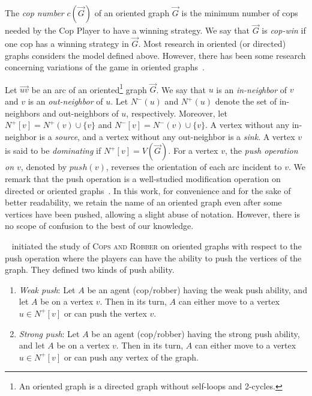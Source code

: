\documentclass[a4paper,12pt]{amsart}
\newcommand{\CR}{\textsc{Cops and Robber}\xspace}
\begin{document}
\smallskip
The \textit{cop number} $c(\overrightarrow{G})$ of an oriented graph $\overrightarrow{G}$ is the minimum number of cops needed by the Cop Player to have a winning strategy. 
We say that $\overrightarrow{G}$  is \textit{cop-win} if one cop has a winning strategy in $\overrightarrow{G}$. Most research in oriented (or directed) graphs considers the model defined above. However, there has been some research concerning variations of the game in oriented graphs~\cite{das2021cops}.

Let $\overrightarrow{uv}$ be an arc of an oriented\footnote{An oriented graph is a directed graph without self-loops and 2-cycles.} graph $\overrightarrow{G}$. 
We say that $u$ is an \textit{in-neighbor} of $v$ and $v$ is an \textit{out-neighbor} of $u$.
Let $N^-(u)$ and $N^+(u)$ denote the set of in-neighbors and out-neighbors of $u$, respectively.  Moreover, let $N^+[v] = N^+(v) \cup \{v\}$ and $N^-[v] = N^-(v) \cup \{v\}$.
A vertex without any in-neighbor is a \textit{source}, and a vertex without any out-neighbor is a \textit{sink}. A vertex $v$ is said to be \textit{dominating} if $N^+[v] = V(\overrightarrow{G})$. For a vertex $v$, the \textit{push operation on $v$}, denoted by $push(v)$, reverses the orientation of each arc incident to $v$.  
We remark that the push operation is a well-studied modification operation on directed or oriented graphs~\cite{fisher-push, klostermeyer1, klostermeyer2, Mosesian, Pretzel1, Pretzel2, Pretzel3, Garyandwood}. In this work, for convenience and for the sake of better readability, we retain the name of an oriented graph even after some vertices have been pushed, allowing a slight abuse of notation. However, there is no scope of confusion to the best of our knowledge.  

  


~\cite{das2023cops} initiated the study of \CR on oriented graphs with respect to the push operation where the players can have the ability to push the vertices of the graph.  They defined two kinds of push ability.

\begin{enumerate}

    \item \textit{Weak push}: Let $A$ be an agent (cop/robber) having the weak push ability, and let $A$ be on a vertex $v$. Then in its turn, $A$ can either move to a vertex $u \in N^+[v]$ or can push the vertex $v$.
    
    \item \textit{Strong push}: Let $A$ be an agent (cop/robber) having the strong push ability, and let $A$ be on a vertex $v$. Then in its turn, $A$ can either move to a vertex $u \in N^+[v]$ or can push any vertex of the graph. 
\end{enumerate}
\end{document}
